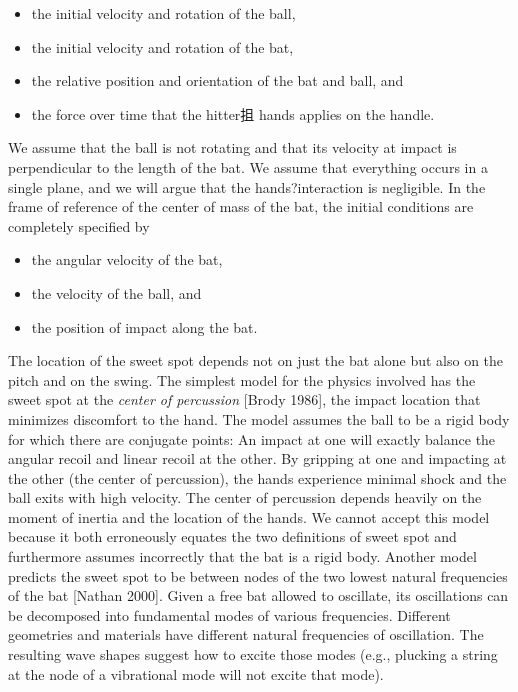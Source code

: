 \begin{itemize}
  \item the initial velocity and rotation of the ball,
\item the initial velocity and rotation of the bat,
\item the relative position and orientation of the bat and ball, and
\item the force over time that the hitter抯 hands applies on the handle.
\end{itemize}
We assume that the ball is not rotating and that its velocity at impact is
perpendicular to the length of the bat. We assume that everything occurs
in a single plane, and we will argue that the hands?interaction is negligible.
In the frame of reference of the center of mass of the bat, the initial conditions
are completely specified by
\begin{itemize}
  \item the angular velocity of the bat,
\item the velocity of the ball, and
\item the position of impact along the bat.
\end{itemize}
The location of the sweet spot depends not on just the bat alone but also
on the pitch and on the swing.
The simplest model for the physics involved has the sweet spot at the
\emph{center of percussion} [Brody 1986], the impact location that minimizes discomfort
to the hand. The model assumes the ball to be a rigid body for which
there are conjugate points: An impact at one will exactly balance the angular
recoil and linear recoil at the other. By gripping at one and impacting at the
other (the center of percussion), the hands experience minimal shock and
the ball exits with high velocity. The center of percussion depends heavily
on the moment of inertia and the location of the hands. We cannot accept
this model because it both erroneously equates the two definitions of sweet
spot and furthermore assumes incorrectly that the bat is a rigid body.
Another model predicts the sweet spot to be between nodes of the two
lowest natural frequencies of the bat [Nathan 2000]. Given a free bat allowed
to oscillate, its oscillations can be decomposed into fundamental
modes of various frequencies. Different geometries and materials have different
natural frequencies of oscillation. The resulting wave shapes suggest
how to excite those modes (e.g., plucking a string at the node of a vibrational
mode will not excite that mode).




